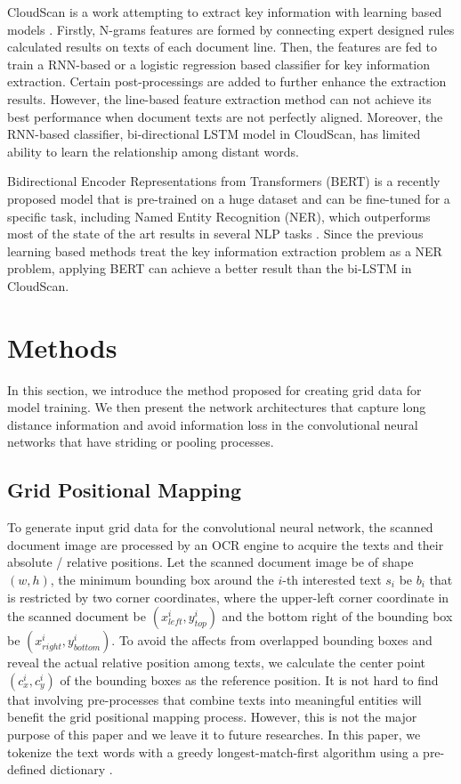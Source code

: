 \documentclass[10pt,twocolumn,letterpaper]{article}
\begin{document}
CloudScan is a work attempting to extract key information with learning based models \cite{cloudscan}. Firstly, N-grams features are formed by connecting expert designed rules calculated results on texts of each document line. Then, the features are fed to train a RNN-based or a logistic regression based classifier for key information extraction. Certain post-processings are added to further enhance the extraction results. However, the line-based feature extraction method can not achieve its best performance when document texts are not perfectly aligned. Moreover, the RNN-based classifier, bi-directional LSTM model in CloudScan, has limited ability to learn the relationship among distant words. 

Bidirectional Encoder Representations from Transformers (BERT) is a recently proposed model that is pre-trained on a huge dataset and can be fine-tuned for a specific task, including Named Entity Recognition (NER), which outperforms most of the state of the art results in several NLP tasks \cite{bert}. Since the previous learning based methods treat the key information extraction problem as a NER problem, applying BERT can achieve a better result than the bi-LSTM in CloudScan.

\section{Methods}
In this section, we introduce the method proposed for creating grid data for model training. We then present the network architectures that capture long distance information and avoid information loss in the convolutional neural networks that have striding or pooling processes.

\subsection{Grid Positional Mapping}
\label{pm}
To generate input grid data for the convolutional neural network, the scanned document image are processed by an OCR engine to acquire the texts and their absolute / relative positions. Let the scanned document image be of shape $(w, h)$, the minimum bounding box around the $i$-th interested text $s_i$ be $b_i$ that is restricted by two corner coordinates, where the upper-left corner coordinate in the scanned document be $(x^i_{left}, y^i_{top})$ and the bottom right of the bounding box be $(x^i_{right}, y^i_{bottom})$. To avoid the affects from overlapped bounding boxes and reveal the actual relative position among texts, we calculate the center point $(c^i_x, c^i_y)$ of the bounding boxes as the reference position. It is not hard to find that involving pre-processes that combine texts into meaningful entities will benefit the grid positional mapping process. However, this is not the major purpose of this paper and we leave it to future researches. In this paper, we tokenize the text words with a greedy longest-match-first algorithm using a pre-defined dictionary \cite{bertgit}. 
\end{document}
